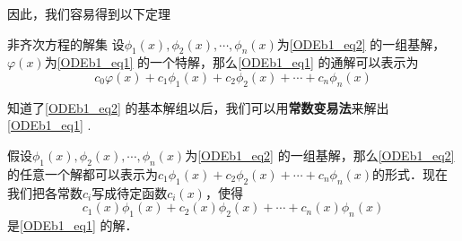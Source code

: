 因此，我们容易得到以下定理
\begin{theorem}{非齐次方程的解集}
设$\phi_1(x), \phi_2(x), \cdots, \phi_n(x)$为\autoref{ODEb1_eq2} 的一组基解，$\varphi(x)$为\autoref{ODEb1_eq1} 的一个特解，那么\autoref{ODEb1_eq1} 的通解可以表示为
\begin{equation}
c_0\varphi(x)+c_1\phi_1(x)+c_2\phi_2(x)+\cdots+c_n\phi_n(x)
\end{equation}
\end{theorem}

知道了\autoref{ODEb1_eq2} 的基本解组以后，我们可以用\textbf{常数变易法}来解出\autoref{ODEb1_eq1} .

假设$\phi_1(x), \phi_2(x), \cdots, \phi_n(x)$为\autoref{ODEb1_eq2} 的一组基解，那么\autoref{ODEb1_eq2} 的任意一个解都可以表示为$c_1\phi_1(x)+c_2\phi_2(x)+\cdots+c_n\phi_n(x)$的形式．现在我们把各常数$c_i$写成待定函数$c_i(x)$，使得
\begin{equation}
c_1(x)\phi_1(x)+c_2(x)\phi_2(x)+\cdots+c_n(x)\phi_n(x)
\end{equation}
是\autoref{ODEb1_eq1} 的解．

